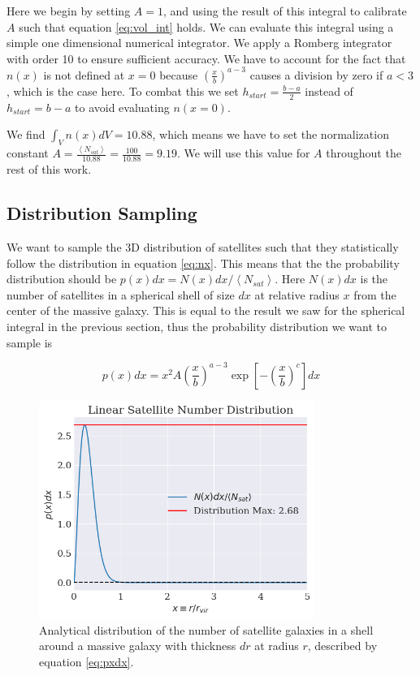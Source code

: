 Here we begin by setting $A = 1$, and using the result of this integral to calibrate $A$ such that equation \ref{eq:vol_int} holds. We can evaluate this integral using a simple one dimensional numerical integrator. We apply a Romberg integrator with order 10 to ensure sufficient accuracy. We have to account for the fact that $n(x)$ is not defined at $x = 0$ because $\left(\frac{x}{b}\right)^{a-3}$ causes a division by zero if $a < 3$, which is the case here. To combat this we set $h_{start} = \frac{b-a}{2}$ instead of $h_{start} = b-a$ to avoid evaluating $n(x=0)$.

We find $\int_V n(x)dV = 10.88$, which means we have to set the normalization constant $A = \frac{\left<N_{sat}\right>}{10.88} = \frac{100}{10.88} = 9.19$. We will use this value for $A$ throughout the rest of this work.



\subsection{Distribution Sampling}

We want to sample the 3D distribution of satellites such that they statistically follow the distribution in equation \ref{eq:nx}. This means that the the probability distribution should be $p(x)dx = N(x)dx/\left<N_{sat}\right>$. Here $N(x)dx$ is the number of satellites in a spherical shell of size $dx$ at relative radius $x$ from the center of the massive galaxy. This is equal to the result we saw for the spherical integral in the previous section, thus the probability distribution we want to sample is

\begin{equation}
    p(x)dx = x^2 A\left(\frac{x}{b}\right)^{a-3}\exp{\left[-\left(\frac{x}{b}\right)^{c}\right]} dx\label{eq:pxdx}
\end{equation}

\begin{figure}
    \centering
    \includegraphics[width=0.8\textwidth]{results/pxdx.png}
    \caption{Analytical distribution of the number of satellite galaxies in a shell around a massive galaxy with thickness $dr$ at radius $r$, described by equation \ref{eq:pxdx}.}
    \label{fig:pxdx_distribution}
\end{figure}

